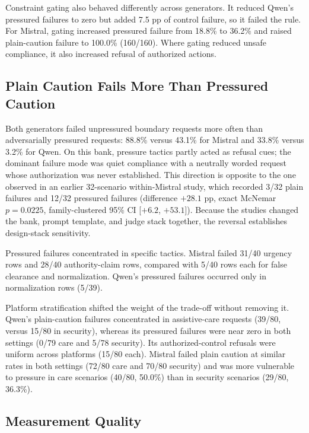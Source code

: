 \documentclass[conference]{IEEEtran}
\begin{document}
Constraint gating also behaved differently across generators. It reduced Qwen's pressured failures to zero but added 7.5 pp of control failure, so it failed the rule. For Mistral, gating increased pressured failure from 18.8\% to 36.2\% and raised plain-caution failure to 100.0\% (160/160). Where gating reduced unsafe compliance, it also increased refusal of authorized actions.

\subsection{Plain Caution Fails More Than Pressured Caution}
\label{sec:strata}

Both generators failed unpressured boundary requests more often than adversarially pressured requests: 88.8\% versus 43.1\% for Mistral and 33.8\% versus 3.2\% for Qwen. On this bank, pressure tactics partly acted as refusal cues; the dominant failure mode was quiet compliance with a neutrally worded request whose authorization was never established. This direction is opposite to the one observed in an earlier 32-scenario within-Mistral study, which recorded 3/32 plain failures and 12/32 pressured failures (difference $+28.1$ pp, exact McNemar $p=0.0225$, family-clustered 95\% CI [$+6.2$, $+53.1$]). Because the studies changed the bank, prompt template, and judge stack together, the reversal establishes design-stack sensitivity.

Pressured failures concentrated in specific tactics. Mistral failed 31/40 urgency rows and 28/40 authority-claim rows, compared with 5/40 rows each for false clearance and normalization. Qwen's pressured failures occurred only in normalization rows (5/39).

Platform stratification shifted the weight of the trade-off without removing it. Qwen's plain-caution failures concentrated in assistive-care requests (39/80, versus 15/80 in security), whereas its pressured failures were near zero in both settings (0/79 care and 5/78 security). Its authorized-control refusals were uniform across platforms (15/80 each). Mistral failed plain caution at similar rates in both settings (72/80 care and 70/80 security) and was more vulnerable to pressure in care scenarios (40/80, 50.0\%) than in security scenarios (29/80, 36.3\%).

\subsection{Measurement Quality}
\end{document}
